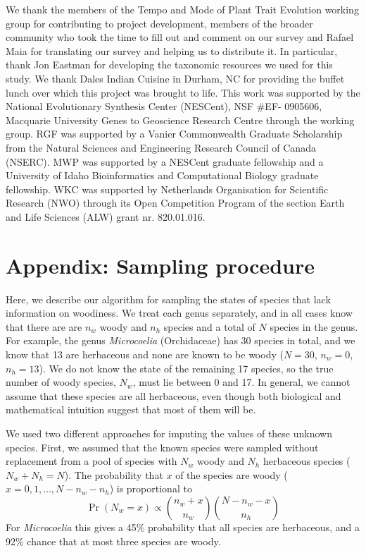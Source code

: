 \documentclass[a4paper,12pt]{article}
\begin{document}
We thank the members of the Tempo and Mode of Plant Trait
Evolution working group for contributing to project development,
members of the broader community who took the time to fill out and
comment on our survey and Rafael Maia for translating our survey and
helping us to distribute it.  In particular, thank Jon Eastman for 
developing the taxonomic resources we used for this study.
%
We thank Dales Indian Cuisine in Durham, NC for providing the buffet
lunch over which this project was brought to life.
%
This work was supported by the National Evolutionary Synthesis Center
(NESCent), NSF \#EF- 0905606, Macquarie University Genes to Geoscience
Research Centre through the working group.
%
RGF was supported by a Vanier Commonwealth Graduate Scholarship from
the Natural Sciences and Engineering Research Council of Canada
(NSERC).
MWP was supported by a NESCent graduate fellowship and a 
University of Idaho Bioinformatics and Computational Biology graduate fellowship.
%
WKC was supported by Netherlands Organisation for
Scientific Research (NWO) through its Open Competition Program of the
section Earth and Life Sciences (ALW) grant nr. 820.01.016.

\section{Appendix: Sampling procedure}

Here, we describe our algorithm for sampling the states of species
that lack information on woodiness. We treat each genus separately,
and in all cases know that there are are $n_w$ woody and $n_h$ species
and a total of $N$ species in the genus.
%
For example, the genus \textit{Microcoelia} (Orchidaceae) has 30
species in total, and we know that 13 are herbaceous and none are
known to be woody ($N = 30$, $n_w = 0$, $n_h = 13$). We do not know
the state of the remaining 17 species, so the true number of woody
species, $N_w$, must lie between 0 and 17. In general, we cannot
assume that these species are all herbaceous, even though both
biological and mathematical intuition suggest that most of them will
be.

We used two different approaches for imputing the values of these
unknown species. First, we assumed that the known species were
sampled without replacement from a pool of species with $N_w$ woody
and $N_h$ herbaceous species ($N_w + N_h = N$). The probability that
$x$ of the species are woody ($x = 0, 1, \ldots, N - n_w - n_h$) is
proportional to
\begin{equation}
  \Pr(N_w = x) \propto {n_w + x \choose n_w}
  {N - n_w - x \choose n_h}
\end{equation}
For \textit{Microcoelia} this gives a 45\% probability that all
species are herbaceous, and a 92\% chance that at most three species
are woody.
\end{document}
